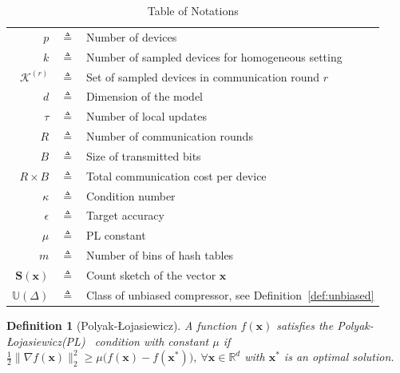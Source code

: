 \documentclass[11pt]{article}
\newcommand{\pl}{Polyak-\L{}ojasiewicz}
\newtheorem{definition}{Definition}
\begin{document}
\begin{table}[htbp]\caption{Table of Notations}
\begin{center}%
\begin{tabular}{r c p{10cm} }
\toprule
$p$ & $\triangleq$ & Number of devices\\
$k$ & $\triangleq$ & Number of sampled devices for homogeneous setting\\
$\mathcal{K}^{(r)}$ & $\triangleq$ & Set of sampled devices in communication round $r$\\
$d$ & $\triangleq$ &  Dimension of the model \\
$\tau$ & $\triangleq$ & Number of local updates\\
$R$ & $\triangleq$ & Number of communication rounds\\
$B$ & $\triangleq$ &  Size of transmitted bits \\
$R\times B$ & $\triangleq$ &  Total communication cost per device \\
$\kappa$ & $\triangleq$ & Condition number\\
$\epsilon$ & $\triangleq$ & Target accuracy\\
$\mu$ & $\triangleq$ & PL constant \\
$m$ & $\triangleq$ &  Number of bins of hash tables \\
 $\mathbf{S}(\boldsymbol{x})$  & $\triangleq$ &  Count sketch of the vector $\boldsymbol{x}$\\
 $\mathbb{U}(\Delta)$  & $\triangleq$ &  Class of unbiased compressor, see Definition~\ref{def:unbiased}\\
\bottomrule
\end{tabular}
\end{center}
\label{tab:notations}
\end{table}

\begin{definition}[\pl]\label{assum:pl}
A function $f(\boldsymbol{x})$ satisfies the \pl (PL)~ condition with constant $\mu$ if $\frac{1}{2}\|\nabla f(\boldsymbol{x})\|_2^2\geq \mu\big(f(\boldsymbol{x})-f(\boldsymbol{x}^*)\big),\: \forall \boldsymbol{x}\in\mathbb{R}^d $ with $\boldsymbol{x}^*$ is an optimal solution.
\end{definition}


\end{document}
